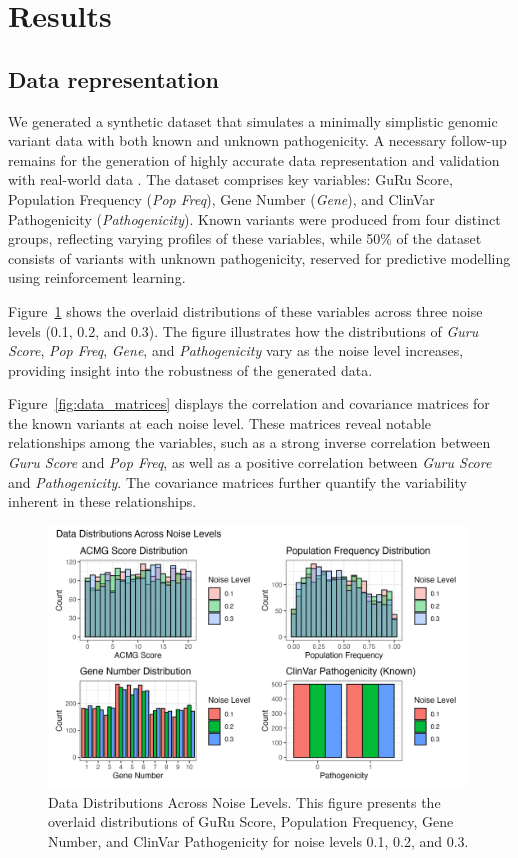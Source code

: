 \section{Results}

\subsection{Data representation}

We generated a synthetic dataset that simulates a minimally simplistic genomic variant data with both known and unknown pathogenicity. 
A necessary follow-up remains for the generation of highly accurate data representation and validation with real-world data .
The dataset comprises key variables: GuRu Score, Population Frequency (\emph{Pop Freq}), Gene Number (\emph{Gene}), and ClinVar Pathogenicity (\emph{Pathogenicity}). Known variants were produced from four distinct groups, reflecting varying profiles of these variables, while 50\% of the dataset consists of variants with unknown pathogenicity, reserved for predictive modelling using reinforcement learning.

Figure~\ref{fig:data_dist} shows the overlaid distributions of these variables across three noise levels (0.1, 0.2, and 0.3). The figure illustrates how the distributions of \emph{Guru Score}, \emph{Pop Freq}, \emph{Gene}, and \emph{Pathogenicity} vary as the noise level increases, providing insight into the robustness of the generated data.

Figure~\ref{fig:data_matrices} displays the correlation and covariance matrices for the known variants at each noise level. These matrices reveal notable relationships among the variables, such as a strong inverse correlation between \emph{Guru Score} and \emph{Pop Freq}, as well as a positive correlation between \emph{Guru Score} and \emph{Pathogenicity}. The covariance matrices further quantify the variability inherent in these relationships.

\begin{figure}[h]
    \centering
    \includegraphics[width=0.99\textwidth]{../figures/data_dist.png}
    \caption{Data Distributions Across Noise Levels. This figure presents the overlaid distributions of GuRu Score, Population Frequency, Gene Number, and ClinVar Pathogenicity for noise levels 0.1, 0.2, and 0.3.}
    \label{fig:data_dist}
\end{figure}

